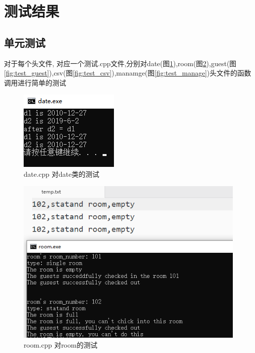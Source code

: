 \documentclass[UTF8]{ctexart}
\begin{document}
\section{测试结果}
  \subsection{单元测试}
    对于每个头文件, 对应一个测试.cpp文件,分别对date(图\ref{fig:test_date}),room(图\ref{fig:test_room}),guest(图\ref{fig:test_guest}),csv(图\ref{fig:test_csv}),manamge(图\ref{fig:test_manage})头文件的函数调用进行简单的测试
    \begin{figure}[H]
      \centering
      \includegraphics[scale=1]{test_date}
      \caption{date.cpp 对date类的测试}
      \label{fig:test_date}
    \end{figure}

    \begin{figure}[H]
      \centering
      \includegraphics[scale=1]{test_room}
      \caption{room.cpp 对room的测试}
      \label{fig:test_room}
    \end{figure}
\end{document}
